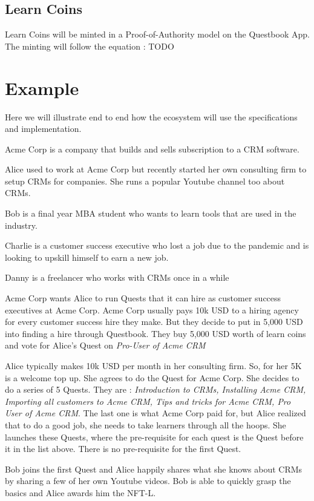\documentclass{article}
\begin{document}
    \subsection{Learn Coins}
      Learn Coins will be minted in a Proof-of-Authority model on the Questbook App. The minting will follow the equation : TODO
  \section{Example}
    Here we will illustrate end to end how the ecosystem will use the specifications and implementation.
    \par
    Acme Corp is a company that builds and sells subscription to a CRM software.
    \par
    Alice used to work at Acme Corp but recently started her own consulting firm to setup CRMs for companies. She runs a popular Youtube channel too about CRMs.
    \par
    Bob is a final year MBA student who wants to learn tools that are used in the industry.
    \par
    Charlie is a customer success executive who lost a job due to the pandemic and is looking to upskill himself to earn a new job.
    \par
    Danny is a freelancer who works with CRMs once in a while
    \par
    Acme Corp wants Alice to run Quests that it can hire as customer success executives at Acme Corp.
    Acme Corp usually pays 10k USD to a hiring agency for every customer success hire they make. But they decide to put in 5,000 USD into finding a hire through Questbook. They buy 5,000 USD worth of learn coins and vote for Alice's Quest on \textit{Pro-User of Acme CRM}
    \par
    Alice typically makes 10k USD per month in her consulting firm. So, for her 5K is a welcome top up. She agrees to do the Quest for Acme Corp. She decides to do a series of 5 Quests.
    They are : \textit{Introduction to CRMs, Installing Acme CRM, Importing all customers to Acme CRM, Tips and tricks for Acme CRM, Pro User of Acme CRM}.
    The last one is what Acme Corp paid for, but Alice realized that to do a good job, she needs to take learners through all the hoops. She launches these Quests, where the pre-requisite for each quest is the Quest before it in the list above.
    There is no pre-requisite for the first Quest.
    \par
    Bob joins the first Quest and Alice happily shares what she knows about CRMs by sharing a few of her own Youtube videos. Bob is able to quickly grasp the basics and Alice awards him the NFT-L.
\end{document}
